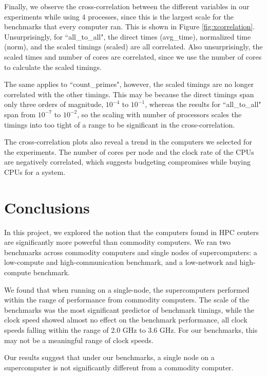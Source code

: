 \documentclass{article}
\begin{document}
Finally, we observe the cross-correlation between the different variables in our experiments while using 4 processes, since this is the largest scale for the benchmarks that every computer ran. This is shown in Figure \ref{fig:xcorrelation}.
Unsurprisingly, for ``all\_to\_all", the direct times (avg\_time), normalized time (norm), and the scaled timings (scaled) are all correlated. Also unsurprisingly, the scaled times and number of cores are correlated, since we use the number of cores to calculate the scaled timings.

The same applies to ``count\_primes", however, the scaled timings are no longer correlated with the other timings. This may be because the direct timings span only three orders of magnitude, $10^{-4}$ to $10^{-1}$, whereas the results for ``all\_to\_all" span from $10^{-7}$ to $10^{-2}$, so the scaling with number of processors scales the timings into too tight of a range to be significant in the cross-correlation.

The cross-correlation plots also reveal a trend in the computers we selected for the experiments. The number of cores per node and the clock rate of the CPUs are negatively correlated, which suggests budgeting compromises while buying CPUs for a system.


\section{Conclusions}

In this project, we explored the notion that the computers found in HPC centers are significantly more powerful than commodity computers. We ran two benchmarks across commodity computers and single nodes of supercomputers: a low-compute and high-communication benchmark, and a low-network and high-compute benchmark.

We found that when running on a single-node, the supercomputers performed within the range of performance from commodity computers. The scale of the benchmarks was the most significant predictor of benchmark timings, while the clock speed showed almost no effect on the benchmark performance, all clock speeds falling within the range of 2.0 GHz to 3.6 GHz. For our benchmarks, this may not be a meaningful range of clock speeds.

Our results suggest that under our benchmarks, a single node on a supercomputer is not significantly different from a commodity computer.
\end{document}
